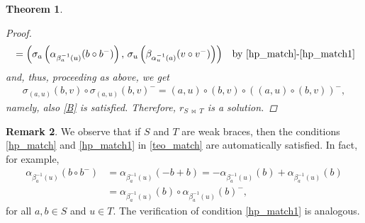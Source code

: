 \documentclass[preprint,1p]{elsarticle}
\newtheorem{theor}{Theorem}[section]
\theoremstyle{definition}               %
\newtheorem{rem}[theor]{Remark}
\begin{document}
\begin{theor}
\begin{proof}
\begin{align*}
    &=\left( \sigma_a\left(\alpha_{\beta^{-1}_a(u)}(b \circ b^-) \right) , \, \sigma_u\left(\beta_{\alpha^{-1}_u(a)}(v \circ v^-)\right)\right) &\mbox{by \eqref{hp_match}-\eqref{hp_match1}}
\end{align*}
and, thus, proceeding as above, we get 
\begin{align*}
   \sigma_{(a,u)}(b, v) \circ \sigma_{(a,u)}(b, v)^-=(a,u)\circ (b,v)\circ \left((a,u)\circ (b,v)\right)^-,
\end{align*}
namely, also \eqref{B} is satisfied. Therefore, $r_{S \ \bowtie \ T}$ is a solution.
   \end{proof}
\end{theor}

\smallskip


\begin{rem}
We observe that if $S$ and $T$ are weak braces, then the conditions \eqref{hp_match} and \eqref{hp_match1} in \cref{teo_match} are automatically satisfied. In fact, for example,
    \begin{align*}
        \alpha_{\beta_a^{-1}(u)}\left(b \circ b^-\right)&=\alpha_{\beta_a^{-1}(u)}\left(-b+b\right)=-\alpha_{\beta_a^{-1}(u)}\left(b\right)+\alpha_{\beta_a^{-1}(u)}\left(b\right)\\
        &=\alpha_{\beta_a^{-1}(u)}(b) \circ \alpha_{\beta_a^{-1}(u)}(b)^-,
    \end{align*}
    for all $a, b \in S$ and $u \in T$. The verification of condition \eqref{hp_match1} is analogous.
\end{rem}

\smallskip
\end{document}
